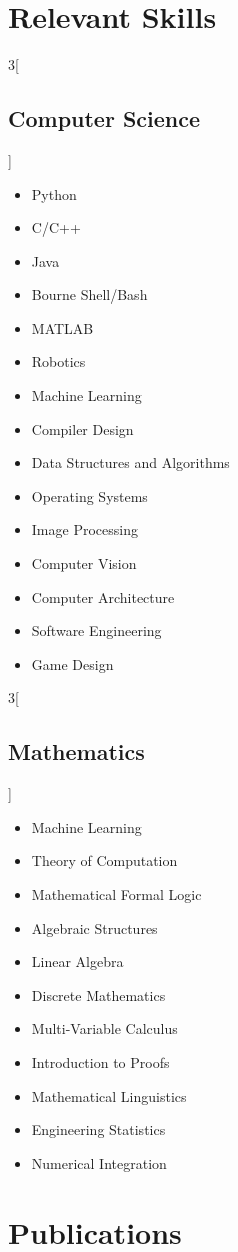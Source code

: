 \documentclass[\ifdefined\cv11pt\else10pt\fi,letterpaper,roman]{moderncv}
\newcommand{\cvonly}[1]{\ifdefined\cv#1\fi}
\newcommand{\resumeonly}[1]{\ifdefined\cv\else#1\fi}
\let\oldsection\section
\renewcommand{\section}[1]{\vspace*{-1.1ex}\oldsection{#1}}
\let\oldsubsection\subsection
\renewcommand{\subsection}[1]{\vspace*{-1.5ex}\oldsubsection{#1}}
\begin{document}
\setlength{\premulticols}{0pt}
\section{Relevant Skills}
\begin{multicols}{3}[\subsection{Computer Science}\vspace*{-1.2\topsep}]
\begin{itemize}
	\item Python
	\item C/C++
	\item Java
	\item Bourne Shell/Bash
	\cvonly{\item MATLAB}
	\item Robotics
	\resumeonly{\item Machine Learning}  %
	\item Compiler Design
	\item Data Structures and Algorithms
	\item Operating Systems
	\item Image Processing
	\cvonly{\item Computer Vision}
	\item Computer Architecture
	\item Software Engineering
	\cvonly{\item Game Design}
\end{itemize}
\end{multicols}
\vspace{-1ex}

\begin{multicols}{3}[\subsection{Mathematics}\vspace*{-1.2\topsep}]
\begin{itemize}
	\cvonly{\item Machine Learning}  %
	\item Theory of Computation
	\item Mathematical Formal Logic
	\item Algebraic Structures
	\item Linear Algebra
	\item Discrete Mathematics
	\item Multi-Variable Calculus
	\cvonly{
		\item Introduction to Proofs
		\item Mathematical Linguistics
		\item Engineering Statistics
		\item Numerical Integration
	}
\end{itemize}
\end{multicols}
\vspace{-2ex}

\section{Publications}
	\nocite{*}
	\printbibliography[heading=none]{}
\end{document}
